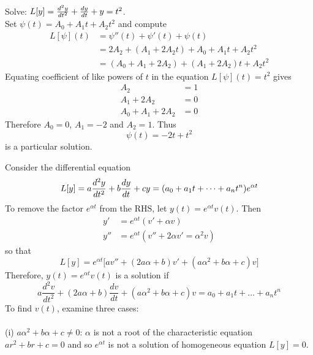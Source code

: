 \documentclass[12pt]{article}
\begin{document}
\begin{example} Solve: $L[y] = \frac{d^2y}{dt^2} + \frac{dy}{dt} + y = t^2$. \\ Set $\psi(t) = A_0 + A_1t + A_2t^2$ and compute 
$$\begin{aligned} L[\psi](t) &= \psi''(t) + \psi'(t) + \psi(t) \\ &= 2A_2 + (A_1+ 2A_2t) + A_0 + A_1t + A_2t^2 \\ &= (A_0 + A_1 + 2A_2) + (A_1 + 2A_2)t + A_2t^2 \end{aligned} $$ 
Equating coefficient of like powers of $t$ in the equation $L[\psi](t) = t^2$ gives $$\begin{aligned} A_2 &= 1 \\ A_1 + 2A_2 &= 0 \\ A_0 + A_1 + 2A_2 &= 0 \end{aligned} $$ 
Therefore $A_0 = 0$,  $A_1 = -2$ and $A_2 = 1$. Thus $$\psi(t) = -2t + t^2 $$ is a particular solution. \end{example}
Consider the differential equation $$L[y] = a\frac{d^2y}{dt^2} + b\frac{dy}{dt} + cy = (a_0 + a_1t + \dots + a_nt^n)e^{\alpha t} $$ 
To remove the factor $e^{\alpha t}$ from the RHS, let $y(t) = e^{\alpha t}v(t)$. Then $$\begin{aligned} y' &= e^{\alpha t}(v' + \alpha v) \\ y'' &= e^{\alpha t}(v'' + 2\alpha v' = \alpha^2v) \end{aligned} $$ so that $$L[y] = e^{\alpha t}\Big[av'' + (2a\alpha + b)v' + (a\alpha^2 + b\alpha + c)v\Big] $$ Therefore, $y(t) = e^{\alpha t}v(t)$ is a solution if $$a\frac{d^2 v}{dt^2} + (2a\alpha + b)\frac{dv}{dt} + (a\alpha^2 + b\alpha + c)v = a_0 + a_1t + \dots + a_nt^n $$ 
To find $v(t)$, examine three cases: \\~\\ 
(i) $a\alpha^2 + b\alpha + c \neq 0$: $\alpha$ is not a root of the characteristic equation $ar^2 + br + c = 0$ and so $e^{\alpha t}$ is not a solution of homogeneous equation $L[y] = 0$. \\
\end{document}
